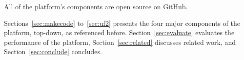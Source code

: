 
All of the platform's components are open source on GitHub.
  
Sections~\ref{sec:makecode} to~\ref{sec:uf2} presents the four major components of the platform, top-down,
as referenced before. Section~\ref{sec:evaluate} evaluates the performance of the platform,
Section~\ref{sec:related} discusses related work, and Section~\ref{sec:conclude}
concludes.
